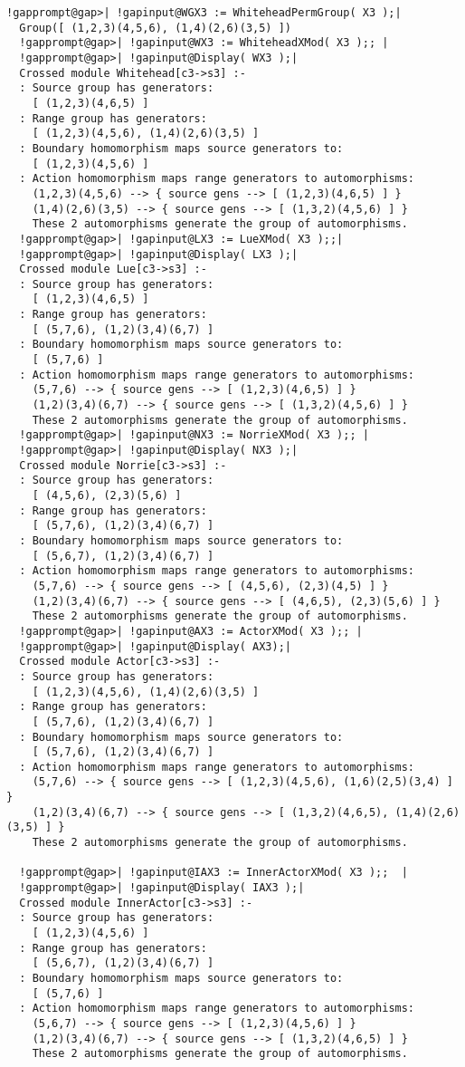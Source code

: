 \documentclass[a4paper,11pt]{report}
\begin{document}
{{\begin{Verbatim}[commandchars=!@|,fontsize=\small,frame=single,label=Example]
  !gapprompt@gap>| !gapinput@WGX3 := WhiteheadPermGroup( X3 );|
  Group([ (1,2,3)(4,5,6), (1,4)(2,6)(3,5) ])
  !gapprompt@gap>| !gapinput@WX3 := WhiteheadXMod( X3 );; |
  !gapprompt@gap>| !gapinput@Display( WX3 );|
  Crossed module Whitehead[c3->s3] :- 
  : Source group has generators:
    [ (1,2,3)(4,6,5) ]
  : Range group has generators:
    [ (1,2,3)(4,5,6), (1,4)(2,6)(3,5) ]
  : Boundary homomorphism maps source generators to:
    [ (1,2,3)(4,5,6) ]
  : Action homomorphism maps range generators to automorphisms:
    (1,2,3)(4,5,6) --> { source gens --> [ (1,2,3)(4,6,5) ] }
    (1,4)(2,6)(3,5) --> { source gens --> [ (1,3,2)(4,5,6) ] }
    These 2 automorphisms generate the group of automorphisms.
  !gapprompt@gap>| !gapinput@LX3 := LueXMod( X3 );;|
  !gapprompt@gap>| !gapinput@Display( LX3 );|
  Crossed module Lue[c3->s3] :- 
  : Source group has generators:
    [ (1,2,3)(4,6,5) ]
  : Range group has generators:
    [ (5,7,6), (1,2)(3,4)(6,7) ]
  : Boundary homomorphism maps source generators to:
    [ (5,7,6) ]
  : Action homomorphism maps range generators to automorphisms:
    (5,7,6) --> { source gens --> [ (1,2,3)(4,6,5) ] }
    (1,2)(3,4)(6,7) --> { source gens --> [ (1,3,2)(4,5,6) ] }
    These 2 automorphisms generate the group of automorphisms.
  !gapprompt@gap>| !gapinput@NX3 := NorrieXMod( X3 );; |
  !gapprompt@gap>| !gapinput@Display( NX3 );|
  Crossed module Norrie[c3->s3] :- 
  : Source group has generators:
    [ (4,5,6), (2,3)(5,6) ]
  : Range group has generators:
    [ (5,7,6), (1,2)(3,4)(6,7) ]
  : Boundary homomorphism maps source generators to:
    [ (5,6,7), (1,2)(3,4)(6,7) ]
  : Action homomorphism maps range generators to automorphisms:
    (5,7,6) --> { source gens --> [ (4,5,6), (2,3)(4,5) ] }
    (1,2)(3,4)(6,7) --> { source gens --> [ (4,6,5), (2,3)(5,6) ] }
    These 2 automorphisms generate the group of automorphisms.
  !gapprompt@gap>| !gapinput@AX3 := ActorXMod( X3 );; |
  !gapprompt@gap>| !gapinput@Display( AX3);|
  Crossed module Actor[c3->s3] :- 
  : Source group has generators:
    [ (1,2,3)(4,5,6), (1,4)(2,6)(3,5) ]
  : Range group has generators:
    [ (5,7,6), (1,2)(3,4)(6,7) ]
  : Boundary homomorphism maps source generators to:
    [ (5,7,6), (1,2)(3,4)(6,7) ]
  : Action homomorphism maps range generators to automorphisms:
    (5,7,6) --> { source gens --> [ (1,2,3)(4,5,6), (1,6)(2,5)(3,4) ] }
    (1,2)(3,4)(6,7) --> { source gens --> [ (1,3,2)(4,6,5), (1,4)(2,6)(3,5) ] }
    These 2 automorphisms generate the group of automorphisms.
  
  !gapprompt@gap>| !gapinput@IAX3 := InnerActorXMod( X3 );;  |
  !gapprompt@gap>| !gapinput@Display( IAX3 );|
  Crossed module InnerActor[c3->s3] :- 
  : Source group has generators:
    [ (1,2,3)(4,5,6) ]
  : Range group has generators:
    [ (5,6,7), (1,2)(3,4)(6,7) ]
  : Boundary homomorphism maps source generators to:
    [ (5,7,6) ]
  : Action homomorphism maps range generators to automorphisms:
    (5,6,7) --> { source gens --> [ (1,2,3)(4,5,6) ] }
    (1,2)(3,4)(6,7) --> { source gens --> [ (1,3,2)(4,6,5) ] }
    These 2 automorphisms generate the group of automorphisms.
  

\end{Verbatim}}}
\end{document}
